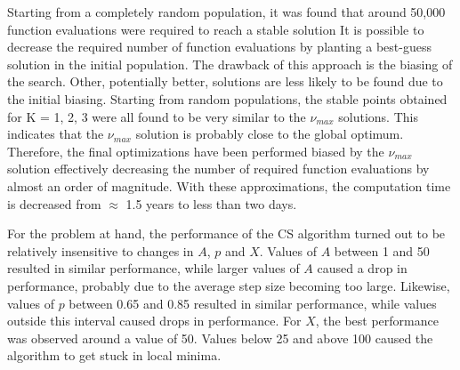 \documentclass[a4paper, 5p, sort&compress]{elsarticle}%
\begin{document}
Starting from a completely random population, it was found that around
50,000 function evaluations were required to reach a stable
solution%
It is possible to decrease the required number of function evaluations
by planting a best-guess solution in the initial population. The
drawback of this approach is the biasing of the search. Other,
potentially better, solutions are less likely to be found due to the
initial biasing. Starting from random populations, the stable points
obtained for K = 1, 2, 3 were all found to be very similar to the
$\nu_{max}$ solutions. This indicates that the $\nu_{max}$ solution is
probably close to the global optimum. Therefore, the final
optimizations have been performed biased by the $\nu_{max}$ solution
effectively decreasing the number of required function evaluations by
almost an order of magnitude. With these approximations, the
computation time is decreased from $\approx$ 1.5 years to less than
two days.

For the problem at hand, the performance of the CS algorithm turned
out to be relatively insensitive to changes in $A$, $p$ and
$X$. Values of $A$ between 1 and 50 resulted in similar performance,
while larger values of $A$ caused a drop in performance, probably due
to the average step size becoming too large. Likewise, values of $p$
between 0.65 and 0.85 resulted in similar performance, while values
outside this interval caused drops in performance. For $X$, the best
performance was observed around a value of 50. Values below 25 and
above 100 caused the algorithm to get stuck in local minima.
\end{document}
